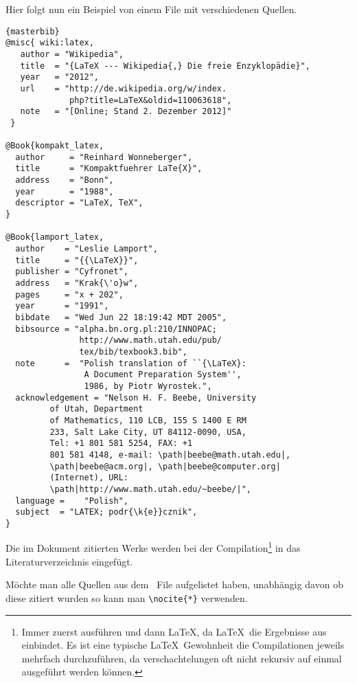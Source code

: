 \noindent 
Hier folgt nun ein Beispiel von einem \Bib File mit verschiedenen Quellen.

\begin{center}
\begin{lstlisting}[caption=BibTeX Datei mit verschiedenen Quellen]{masterbib}
@misc{ wiki:latex,
   author = "Wikipedia",
   title  = "{LaTeX --- Wikipedia{,} Die freie Enzyklopädie}",
   year   = "2012",
   url    = "http://de.wikipedia.org/w/index.
             php?title=LaTeX&oldid=110063618",
   note   = "[Online; Stand 2. Dezember 2012]"
 }
 
@Book{kompakt_latex,
  author     = "Reinhard Wonneberger",
  title      = "Kompaktfuehrer LaTe{X}",
  address    = "Bonn",
  year       = "1988",
  descriptor = "LaTeX, TeX",
}

@Book{lamport_latex,
  author    = "Leslie Lamport",
  title     = "{{\LaTeX}}",
  publisher = "Cyfronet",
  address   = "Krak{\'o}w",
  pages     = "x + 202",
  year      = "1991",
  bibdate   = "Wed Jun 22 18:19:42 MDT 2005",
  bibsource = "alpha.bn.org.pl:210/INNOPAC;
               http://www.math.utah.edu/pub/
               tex/bib/texbook3.bib",
  note      =  "Polish translation of ``{\LaTeX}: 
                A Document Preparation System'', 
                1986, by Piotr Wyrostek.",
  acknowledgement = "Nelson H. F. Beebe, University 
         of Utah, Department
         of Mathematics, 110 LCB, 155 S 1400 E RM 
         233, Salt Lake City, UT 84112-0090, USA, 
         Tel: +1 801 581 5254, FAX: +1
         801 581 4148, e-mail: \path|beebe@math.utah.edu|,
         \path|beebe@acm.org|, \path|beebe@computer.org|
         (Internet), URL:
         \path|http://www.math.utah.edu/~beebe/|",
  language =    "Polish",
  subject  = "LATEX; podr{\k{e}}cznik",
}

\end{lstlisting}
\end{center}

\noindent
Die im Dokument zitierten Werke werden bei der Compilation\footnote{Immer 
zuerst \BibTeX ausführen und dann \LaTeX, da \LaTeX~die Ergebnisse aus \BibTeX~
einbindet. Es ist eine typische \LaTeX~Gewohnheit die Compilationen jeweils 
mehrfach durchzuführen, da verschachtelungen oft nicht rekursiv auf einmal 
ausgeführt werden können.} in das Literaturverzeichnis eingefügt.

Möchte man alle Quellen aus dem \BibTeX~File aufgelistet haben, unabhängig 
davon ob diese zitiert wurden so kann man \lstinline|\nocite{*}| verwenden.


